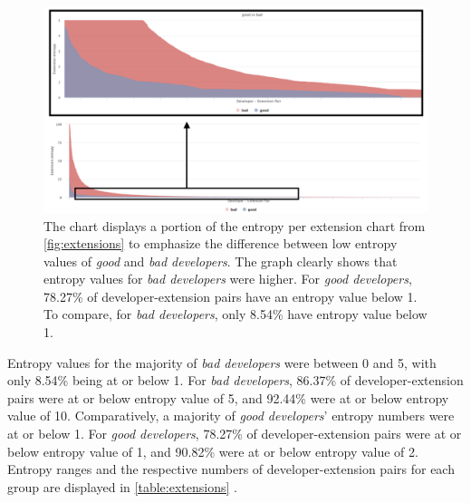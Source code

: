 \begin{figure}[htpb]
  \centering
  \includegraphics[width=1\textwidth]{figures/ext_zoom}
  \caption[Focus Per Extension For Lower Entropy Values]{The chart displays a portion of the entropy per extension chart from \autoref{fig:extensions} to emphasize the difference between low entropy values of \textit{good} and\textit{ bad developers}. The graph clearly shows that entropy values for \textit{bad developers} were higher. For \textit{good developers}, 78.27\% of developer-extension pairs have an entropy value below 1. To compare, for \textit{bad developers}, only 8.54\% have entropy value below 1.} \label{fig:extensions_zoom}
\end{figure}

Entropy values for the majority of \textit{bad developers} were between 0 and 5, with only 8.54\% being at or below 1. For \textit{bad developers}, 86.37\% of developer-extension pairs were at or below entropy value of 5, and 92.44\% were at or below entropy value of 10. Comparatively, a majority of \textit{good developers}’ entropy numbers were at or below 1. For \textit{good developers}, 78.27\% of developer-extension pairs were at or below entropy value of 1, and 90.82\% were at or below entropy value of 2. Entropy ranges and the respective numbers of developer-extension pairs for each group are displayed in \autoref{table:extensions} . 

